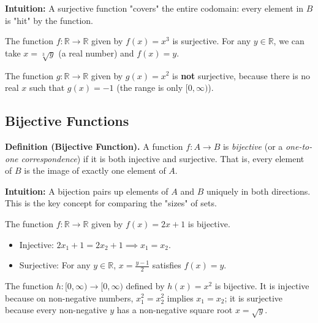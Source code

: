 \documentclass[11pt,a4paper]{article}
\begin{document}
\textbf{Intuition:} A surjective function "covers" the entire codomain: every element in $B$ is "hit" by the function.

\begin{example}[Surjective]
The function $f: \mathbb{R} \to \mathbb{R}$ given by $f(x) = x^3$ is surjective. For any $y \in \mathbb{R}$, we can take $x = \sqrt[3]{y}$ (a real number) and $f(x) = y$.
\end{example}

\begin{example}
The function $g: \mathbb{R} \to \mathbb{R}$ given by $g(x) = x^2$ is \textbf{not} surjective, because there is no real $x$ such that $g(x) = -1$ (the range is only $[0, \infty)$).
\end{example}

\subsection{Bijective Functions}

\textbf{Definition (Bijective Function).} A function $f: A \to B$ is \textit{bijective} (or a \textit{one-to-one correspondence}) if it is both injective and surjective. That is, every element of $B$ is the image of exactly one element of $A$.

\textbf{Intuition:} A bijection pairs up elements of $A$ and $B$ uniquely in both directions. This is the key concept for comparing the "sizes" of sets.

\begin{example}[Bijective]
The function $f: \mathbb{R} \to \mathbb{R}$ given by $f(x) = 2x + 1$ is bijective.
\begin{itemize}[label=--]
    \item Injective: $2x_1 + 1 = 2x_2 + 1 \implies x_1 = x_2$.
    \item Surjective: For any $y \in \mathbb{R}$, $x = \frac{y-1}{2}$ satisfies $f(x) = y$.
\end{itemize}
\end{example}

\begin{example}
The function $h: [0, \infty) \to [0, \infty)$ defined by $h(x) = x^2$ is bijective. It is injective because on non-negative numbers, $x_1^2 = x_2^2$ implies $x_1 = x_2$; it is surjective because every non-negative $y$ has a non-negative square root $x = \sqrt{y}$.
\end{example}
\end{document}
